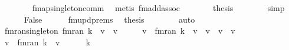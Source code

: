 \begin{isabellebody}
\ \ \ \ \ \ \isamarkupfalse%
\ fmap{\isacharunderscore}{\kern0pt}singleton{\isacharunderscore}{\kern0pt}comm\ \isamarkupfalse%
\ {\isacharparenleft}{\kern0pt}metis\ fmadd{\isacharunderscore}{\kern0pt}assoc{\isacharparenright}{\kern0pt}\isanewline
\ \ \ \ \isamarkupfalse%
\ \isamarkupfalse%
\ {\isacharquery}{\kern0pt}thesis\isanewline
\ \ \ \ \ \ \isamarkupfalse%
\ simp\isanewline
\ \ \isamarkupfalse%
\isanewline
\ \ \ \ \isamarkupfalse%
\ False\isanewline
\ \ \ \ \isamarkupfalse%
\ fmupd{\isachardot}{\kern0pt}prems\ \isamarkupfalse%
\ {\isacharquery}{\kern0pt}thesis\isanewline
\ \ \ \ \ \ \isamarkupfalse%
\ auto\isanewline
\ \ \isamarkupfalse%
\isanewline
{}\isamarkupfalse%
%
\endisatagproof
{\isafoldproof}%
%
\isadelimproof
\isanewline
%
\endisadelimproof
\isanewline
{}\isamarkupfalse%
\ fmran{\isacharunderscore}{\kern0pt}singleton{\isacharcolon}{\kern0pt}\ {\isachardoublequoteopen}fmran\ {\isacharbraceleft}{\kern0pt}k\ {\isachardollar}{\kern0pt}{\isachardollar}{\kern0pt}{\isacharcolon}{\kern0pt}{\isacharequal}{\kern0pt}\ v{\isacharbraceright}{\kern0pt}\ {\isacharequal}{\kern0pt}\ {\isacharbraceleft}{\kern0pt}{\isacharbar}{\kern0pt}v{\isacharbar}{\kern0pt}{\isacharbraceright}{\kern0pt}{\isachardoublequoteclose}\isanewline
%
\isadelimproof
%
\endisadelimproof
%
\isatagproof
{}\isamarkupfalse%
\ {\isacharminus}{\kern0pt}\isanewline
\ \ \isamarkupfalse%
\ {\isachardoublequoteopen}v{\isacharprime}{\kern0pt}\ {\isacharbar}{\kern0pt}{\isasymin}{\isacharbar}{\kern0pt}\ fmran\ {\isacharbraceleft}{\kern0pt}k\ {\isachardollar}{\kern0pt}{\isachardollar}{\kern0pt}{\isacharcolon}{\kern0pt}{\isacharequal}{\kern0pt}\ v{\isacharbraceright}{\kern0pt}\ {\isasymLongrightarrow}\ v{\isacharprime}{\kern0pt}\ {\isacharequal}{\kern0pt}\ v{\isachardoublequoteclose}\ \ v{\isacharprime}{\kern0pt}\isanewline
\ \ \isamarkupfalse%
\ {\isacharminus}{\kern0pt}\isanewline
\ \ \ \ \isamarkupfalse%
\ {\isachardoublequoteopen}v{\isacharprime}{\kern0pt}\ {\isacharbar}{\kern0pt}{\isasymin}{\isacharbar}{\kern0pt}\ fmran\ {\isacharbraceleft}{\kern0pt}k\ {\isachardollar}{\kern0pt}{\isachardollar}{\kern0pt}{\isacharcolon}{\kern0pt}{\isacharequal}{\kern0pt}\ v{\isacharbraceright}{\kern0pt}{\isachardoublequoteclose}\isanewline
\ \ \ \ \isamarkupfalse%
\ k{\isacharprime}{\kern0pt}\isanewline

\end{isabellebody}
